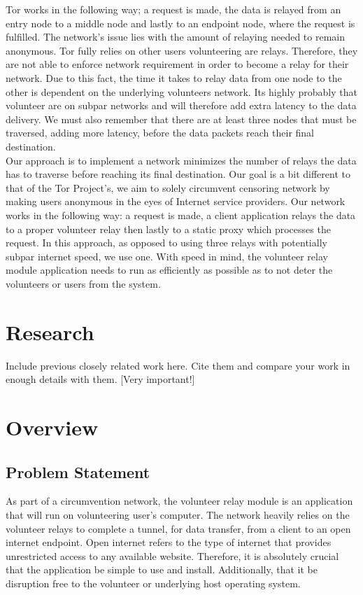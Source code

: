 \documentclass[12pt,a4paper]{report}
\begin{document}
Tor works in the following way; a request is made, the data is relayed from an entry node to a middle node and lastly to an endpoint node, where the request is fulfilled. The network's issue lies with the amount of relaying needed to remain anonymous. Tor fully relies on other users volunteering are relays. Therefore, they are not able to enforce network requirement in order to become a relay for their network. Due to this fact, the time it takes to relay data from one node to the other is dependent on the underlying volunteers network. Its highly probably that volunteer are on subpar networks and will therefore add extra latency to the data delivery. We must also remember that there are at least three nodes that must be traversed, adding more latency, before the data packets reach their final destination.\\ 

Our approach is to implement a network minimizes the number of relays the data has to traverse before reaching its final destination. Our goal is a bit different to that of the Tor Project's, we aim to solely circumvent censoring network by making users anonymous in the eyes of Internet service providers. Our network works in the following way: a request is made, a client application relays the data to a proper volunteer relay then lastly to a static proxy which processes the request. In this approach, as opposed to using three relays with potentially subpar internet speed, we use one. With speed in mind, the volunteer relay module application needs to run as efficiently as possible as to not deter the volunteers or users from the system. 


\chapter{Research}


Include previous closely related work
here. Cite them and compare your work in enough details with them. [Very
important!]
\chapter{Overview}
	
	\section{Problem Statement}
	As part of a circumvention network, the volunteer relay module is an application that will run on volunteering user's computer. The network heavily relies on the volunteer relays to complete a tunnel, for data transfer, from a client to an open internet endpoint. Open internet refers to the type of internet that provides unrestricted access to any available website. Therefore, it is absolutely crucial that the application be simple to use and install. Additionally, that it be disruption free to the volunteer or underlying host operating system.\\ 
	 
\end{document}
